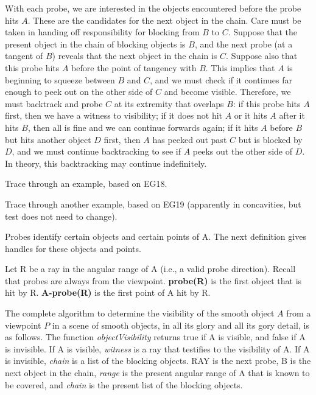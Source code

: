 \documentclass[12pt]{article}
\begin{document}
With each probe, we are interested in the objects encountered before the probe hits $A$.
These are the candidates for the next object in the chain.
Care must be taken in handing off responsibility for blocking from $B$ to $C$.
Suppose that the present object in the chain of blocking objects is $B$,
and the next probe (at a tangent of $B$)
reveals that the next object in the chain is $C$.
Suppose also that this probe hits $A$ before the point of tangency with $B$.
This implies that $A$ is beginning to squeeze between $B$ and $C$,
and we must check if it continues far enough to peek out on the other side of $C$
and become visible.
Therefore, we must backtrack and probe $C$ at its extremity that overlaps $B$:
if this probe hits $A$ first, then we have a witness to visibility;
if it does not hit $A$ or it hits $A$ after it hits $B$, 
then all is fine and we can continue forwards again;
if it hits $A$ before $B$ but hits another object $D$ first,
then $A$ has peeked out past $C$ but is blocked by $D$, 
and we must continue backtracking to see if $A$ peeks out the other side of $D$.
In theory, this backtracking may continue indefinitely.

Trace through an example, based on EG18.

Trace through another example, based on EG19 (apparently in concavities, but test does
not need to change).

Probes identify certain objects and certain points of A.
The next definition gives handles for these objects and points.
\begin{defn2}
Let R be a ray in the angular range of A (i.e., a valid probe direction).
Recall that probes are always from the viewpoint.
{\bf probe(R)} is the first object that is hit by R.
{\bf A-probe(R)} is the first point of A hit by R.
\end{defn2}

The complete algorithm to determine the visibility of the smooth object $A$
from a viewpoint $P$ in a scene of smooth objects, 
in all its glory and all its gory detail, is as follows.
The function {\em objectVisibility} returns true if A is visible, and false
if A is invisible.
If A is visible, {\em witness} is a ray that testifies to the visibility of A.
If A is invisible, {\em chain}  is a list of the blocking objects.
RAY is the next probe, B is the next object in the chain, {\em range} is the present
angular range of A that is known to be covered, and {\em chain} is the present list of the
blocking objects.
\end{document}
